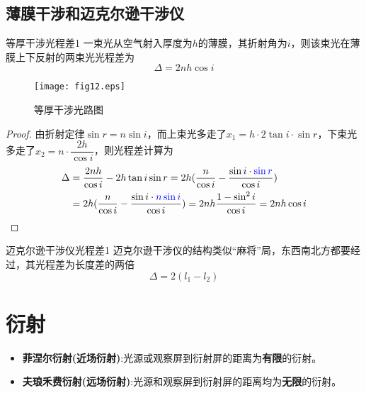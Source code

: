 \subsection{薄膜干涉和迈克尔逊干涉仪}

\begin{myprop}{ 等厚干涉光程差}{1}
	一束光从空气射入厚度为$h$的薄膜，其折射角为$i$，则该束光在薄膜上下反射的两束光光程差为
	\[
		\Delta = 2nh\cos i
	\]
\end{myprop}
\begin{figure}[htbp]
	\centering
	\texttt{[image: fig12.eps]}
	\caption{等厚干涉光路图}
\end{figure}
\begin{proof}
	由折射定律$\sin r=n\sin i$，而上束光多走了$x_1=h\cdot 2\tan i\cdot \sin r$，下束光多走了$x_2=n\cdot \dfrac{2h}{\cos i}$，则光程差计算为
	\[
		\begin{aligned}
			\Delta&=\dfrac{2nh}{\cos i}-2h\tan i\sin r=2h(\dfrac{n}{\cos i}-\dfrac{\sin i \cdot \textcolor{blue}{\sin r}}{\cos i})\\
			&=2h(\dfrac{n}{\cos i}-\dfrac{\sin i \cdot \textcolor{blue}{n \sin i}}{\cos i})
			=2nh\dfrac{1-\sin^2 i}{\cos i}=2nh\cos i
		\end{aligned}
	\]
\end{proof}
\begin{myprop}{ 迈克尔逊干涉仪光程差}{1}
	迈克尔逊干涉仪的结构类似“麻将”局，东西南北方都要经过，其光程差为长度差的两倍
	\[
		\Delta=2(l_1-l_2)
	\]
\end{myprop}



\section{衍射}

\begin{itemize}
	\item \textbf{菲涅尔衍射(近场衍射)}:光源或观察屏到衍射屏的距离为\textbf{有限}的衍射。
	\item \textbf{夫琅禾费衍射(远场衍射)}:光源和观察屏到衍射屏的距离均为\textbf{无限}的衍射。
\end{itemize}


